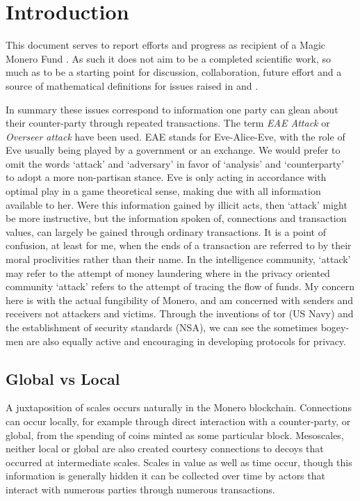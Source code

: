 \section{Introduction}

This document serves to report efforts and progress as recipient of a Magic Monero Fund \cite{MMF}.  As such it does not aim to be a completed scientific work, so much as to be a starting point for discussion, collaboration, future effort and a source of mathematical definitions for issues raised in \cite{MiersZcash} and \cite{breakingChurn}.

In summary these issues correspond to information one party can glean about their counter-party through repeated transactions.  
The term \textit{EAE Attack} or \textit{Overseer attack} have been used.  EAE stands for Eve-Alice-Eve, with the role of Eve usually being played by a government or an exchange.  
We would prefer to omit the words `attack' and `adversary' in favor of `analysis' and `counterparty' to adopt a more non-partisan stance.  
Eve is only acting in accordance with optimal play in a game theoretical sense, making due with all information available to her.  Were this information gained by illicit acts, then `attack' might be more instructive, but the information spoken of, connections and transaction values, can largely be gained through ordinary transactions. 
It is a point of confusion, at least for me, when the ends of a transaction are referred to by their moral proclivities rather than their name.
In the intelligence community, `attack' may refer to the attempt of money laundering where in the privacy oriented community `attack' refers to the attempt of tracing the flow of funds.  
My concern here is with the actual fungibility of Monero, and am concerned with senders and receivers not attackers and victims.
Through the inventions of tor (US Navy) and the establishment of security standards (NSA), we can see the sometimes bogey-men are also equally active and encouraging in developing protocols for privacy.

\subsection{Global vs Local}

A juxtaposition of scales occurs naturally in the Monero blockchain. 
Connections can occur locally, for example through direct interaction with a counter-party, or global, from the spending of coins minted as some particular block.
Mesoscales, neither local or global are also created courtesy connections to decoys that occurred at intermediate scales.
Scales in value as well as time occur, though this information is generally hidden it can be collected over time by actors that interact with numerous parties through numerous transactions.

